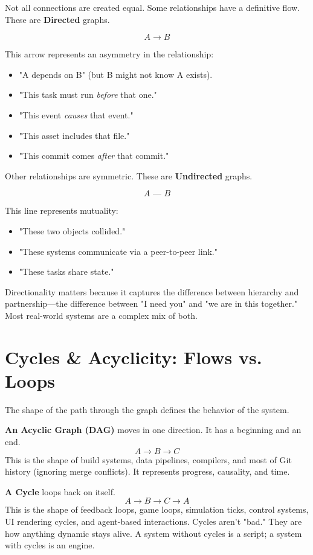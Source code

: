 Not all connections are created equal. Some relationships have a definitive flow. These are \textbf{Directed} graphs.

\[ A \rightarrow B \]

This arrow represents an asymmetry in the relationship:
\begin{itemize}
    \item "A depends on B" (but B might not know A exists).
    \item "This task must run \textit{before} that one."
    \item "This event \textit{causes} that event."
    \item "This asset includes that file."
    \item "This commit comes \textit{after} that commit."
\end{itemize}

Other relationships are symmetric. These are \textbf{Undirected} graphs.

\[ A \text{ --- } B \]

This line represents mutuality:
\begin{itemize}
    \item "These two objects collided."
    \item "These systems communicate via a peer-to-peer link."
    \item "These tasks share state."
\end{itemize}

Directionality matters because it captures the difference between hierarchy and partnership—the difference between "I need you" and "we are in this together." Most real-world systems are a complex mix of both.

\section{Cycles \& Acyclicity: Flows vs. Loops}
\label{sec:cycles-acyclicity}

The shape of the path through the graph defines the behavior of the system.

\textbf{An Acyclic Graph (DAG)} moves in one direction. It has a beginning and an end.
\[ A \rightarrow B \rightarrow C \]
This is the shape of build systems, data pipelines, compilers, and most of Git history (ignoring merge conflicts). It represents progress, causality, and time.

\textbf{A Cycle} loops back on itself.
\[ A \rightarrow B \rightarrow C \rightarrow A \]
This is the shape of feedback loops, game loops, simulation ticks, control systems, UI rendering cycles, and agent-based interactions. Cycles aren't "bad." They are how anything dynamic stays alive. A system without cycles is a script; a system with cycles is an engine.

